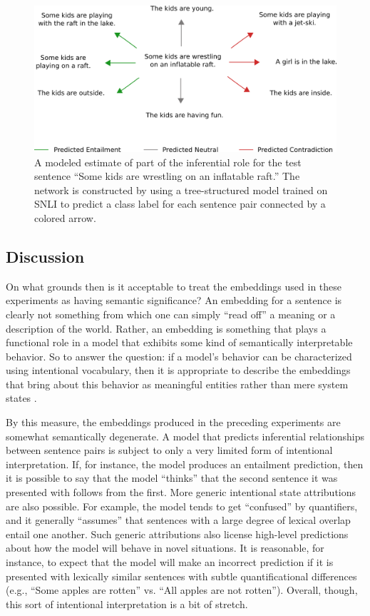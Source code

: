 \begin{figure}
\centering
	\includegraphics[scale=0.53]{figures/inf-role.png}
	\caption{A modeled estimate of part of the inferential role for the test sentence ``Some kids are wrestling on an inflatable raft.'' The network is constructed by using a tree-structured model trained on SNLI to predict a class label for each sentence pair connected by a colored arrow.}\label{fig:infrole}
\end{figure}

\subsection{Discussion}

On what grounds then is it acceptable to treat the embeddings used in these experiments as having semantic significance? An embedding for a sentence is clearly not something from which one can simply ``read off'' a meaning or a description of the world. Rather, an embedding is something that plays a functional role in a model that exhibits some kind of semantically interpretable behavior. So to answer the question: if a model's behavior can be characterized using intentional vocabulary, then it is appropriate to describe the embeddings that bring about this behavior as meaningful entities rather than mere system states \citep[see][]{Dennett:1987}. 

By this measure, the embeddings produced in the preceding experiments are somewhat semantically degenerate. A model that predicts inferential relationships between sentence pairs is subject to only a very limited form of intentional interpretation. If, for instance, the model produces an entailment prediction, then it is possible to say that the model ``thinks'' that the second sentence it was presented with follows from the first. More generic intentional state attributions are also possible. For example, the model tends to get ``confused'' by quantifiers, and it generally ``assumes'' that sentences with a large degree of lexical overlap entail one another. Such generic attributions also license high-level predictions about how the model will behave in novel situations. It is reasonable, for instance, to expect that the model will make an incorrect prediction if it is presented with lexically similar sentences with subtle quantificational differences (e.g., ``Some apples are rotten'' vs. ``All apples are not rotten''). Overall, though, this sort of intentional interpretation is a bit of stretch.

